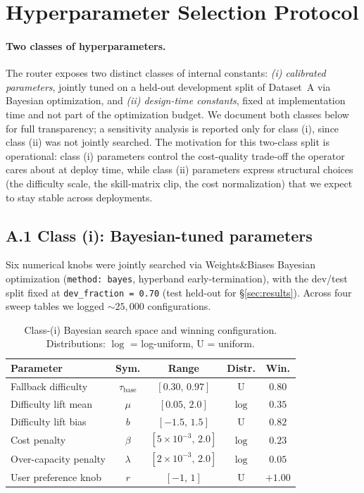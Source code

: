 \documentclass[twocolumn,10pt,a4paper]{article}
\begin{document}
\appendix
\section{Hyperparameter Selection Protocol}\label{app:hpo}

\paragraph{Two classes of hyperparameters.} The router exposes two distinct classes of internal constants: \emph{(i) calibrated parameters}, jointly tuned on a held-out development split of Dataset~A via Bayesian optimization, and \emph{(ii) design-time constants}, fixed at implementation time and not part of the optimization budget. We document both classes below for full transparency; a sensitivity analysis is reported only for class (i), since class (ii) was not jointly searched. The motivation for this two-class split is operational: class (i) parameters control the cost-quality trade-off the operator cares about at deploy time, while class (ii) parameters express structural choices (the difficulty scale, the skill-matrix clip, the cost normalization) that we expect to stay stable across deployments.

\subsection*{A.1 Class (i): Bayesian-tuned parameters}
Six numerical knobs were jointly searched via Weights\&Biases Bayesian optimization (\texttt{method: bayes}, hyperband early-termination), with the dev/test split fixed at \texttt{dev\_fraction = 0.70} (test held-out for §\ref{sec:results}). Across four sweep tables we logged $\sim 25{,}000$ configurations.

\begin{table}[H]
\centering
\caption{Class-(i) Bayesian search space and winning configuration. Distributions: $\log$ = log-uniform, $\mathrm{U}$ = uniform.}
\label{tab:app_searchspace}
\small\setlength{\tabcolsep}{4pt}
\begin{tabular}{l c c c c}
\toprule
\textbf{Parameter} & Sym. & Range & Distr. & Win. \\
\midrule
Fallback difficulty       & $\tau_\text{base}$ & $[0.30,\,0.97]$ & $\mathrm{U}$  & $0.80$ \\
Difficulty lift mean      & $\mu$              & $[0.05,\,2.0]$  & $\log$        & $0.35$ \\
Difficulty lift bias      & $b$                & $[-1.5,\,1.5]$  & $\mathrm{U}$  & $0.82$ \\
Cost penalty              & $\beta$            & $[5{\times}10^{-3},\,2.0]$ & $\log$ & $0.23$ \\
Over-capacity penalty     & $\lambda$          & $[2{\times}10^{-3},\,2.0]$ & $\log$ & $0.05$ \\
User preference knob      & $r$                & $[-1,\,1]$      & $\mathrm{U}$  & $+1.00$ \\
\bottomrule
\end{tabular}
\end{table}
\end{document}
